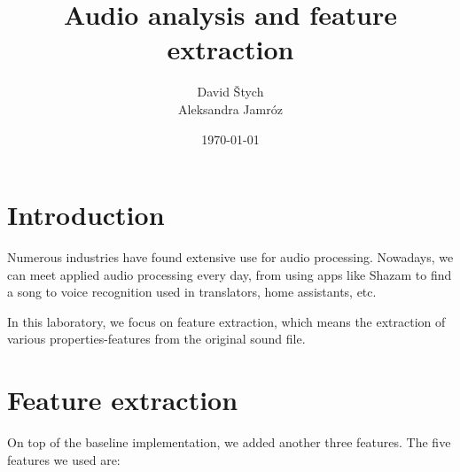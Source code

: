 \documentclass{article}
\title{Audio analysis and feature extraction}
\author{David Štych\\ Aleksandra Jamróz}
\date{\today{}}
\begin{document}
\maketitle

\section*{Introduction}
Numerous industries have found extensive use for audio processing. Nowadays, we can meet applied audio processing every day, from using apps like Shazam to find a song to voice recognition used in translators, home assistants, etc.

In this laboratory, we focus on feature extraction, which means the extraction of various properties-features from the original sound file. 


\section*{Feature extraction}
On top of the baseline implementation, we added another three features. The five features we used are:
\end{document}
